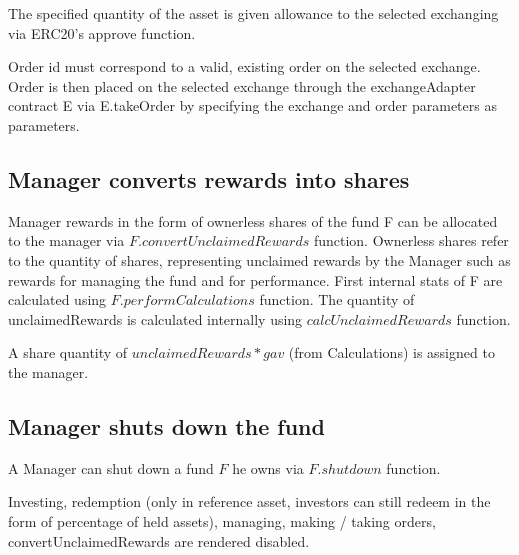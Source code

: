 \documentclass[conference]{IEEEtran}
\begin{document}
The specified quantity of the asset is given allowance to the selected exchanging via ERC20's approve function.

Order id must correspond to a valid, existing order on the selected exchange. Order is then placed on the selected exchange through the exchangeAdapter contract E via E.takeOrder by specifying the exchange and order parameters as parameters.

\subsection{Manager converts rewards into shares}

Manager rewards in the form of ownerless shares of the fund F can be allocated to the manager via $F.convertUnclaimedRewards$ function. Ownerless shares refer to the quantity of shares, representing unclaimed rewards by the Manager such as rewards for managing the fund and for performance. First internal stats of F are calculated using $F.performCalculations$ function. The quantity of unclaimedRewards is calculated internally using $calcUnclaimedRewards$ function.

A share quantity of $unclaimedRewards * gav$ (from Calculations) is assigned to the manager.

\subsection{Manager shuts down the fund}

A Manager can shut down a fund $F$ he owns via $F.shutdown$ function.

Investing, redemption (only in reference asset, investors can still redeem in the form of percentage of held assets), managing, making / taking orders, convertUnclaimedRewards are rendered disabled.
%
%
\end{document}
